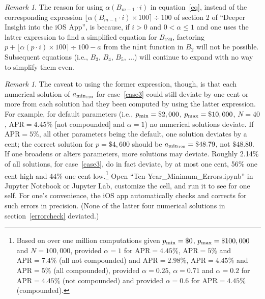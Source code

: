 \documentclass[12pt,letterpaper,oneside]{article}
\theoremstyle{remark} %
\newtheorem{remark}[theorem]{Remark}
\begin{document}
	\newpage
	\begin{remark}
	The reason for using $\alpha\left(B_{m-1}\cdot i\right)$ in equation~\ref{eq}, instead of the corresponding expression $\big\lfloor{\alpha\left(B_{m-1}\cdot i\right)\times 100}\big\rceil\div 100$ of section 2 of ``Deeper Insight into the iOS App'', is because, if $i>0$ and $0<\alpha\leq1$ and one uses the latter expression to find a simplified equation for $B_{120}$, factoring $p+\big\lfloor{\alpha\left(p\cdot i\right)\times 100}\big\rceil\div 100-a$ from the \texttt{nint} function in $B_{2}$ will not be possible. Subsequent equations (i.e., $B_{3}$, $B_{4}$, $B_{5}$, $\dots$) will continue to expand with no way to simplify them even.
	\end{remark}
	
	\vspace{12pt}
	\begin{remark} The caveat to using the former expression, though, is that each numerical solution of $a_{\rm{min_{120}}}$ for case~\ref{case3} could still deviate by one cent or more from each solution had they been computed by using the latter expression. For example, for default parameters (i.e., $p_{\rm{min}}=\$2,000$, $p_{\rm{max}}=\$10,000$, $N=40$, $\mbox{APR}=4.45\%$ [not compounded] and $\alpha =1$) no numerical solutions deviate. If $\mbox{APR}=5\%$, all other parameters being the default, one solution deviates by a cent; the correct solution for $p=\$4,600$ should be $a_{\rm{min_{120}}}=\$48.79$, not $\$48.80$. If one broadens or alters parameters, more solutions may deviate. Roughly 2.14\% of all solutions, for case~\ref{case3}, do in fact deviate, by at most one cent, 56\% one cent high and 44\% one cent low.\footnote{Based on over one million computations given $p_{\rm{min}}=\$0$, $p_{\rm{max}}=\$100,000$ and $N=100,000$, provided $\alpha =1$ for $\mbox{APR}=4.45\%$, $\mbox{APR}=5\%$ and $\mbox{APR}=7.4\%$ (all not compounded) and $\mbox{APR}=2.98\%$, $\mbox{APR}=4.45\%$ and $\mbox{APR}=5\%$ (all compounded), provided $\alpha =0.25$, $\alpha =0.71$ and $\alpha =0.2$ for $\mbox{APR}=4.45\%$ (not compounded) and provided $\alpha =0.6$ for $\mbox{APR}=4.45\%$ (compounded).} Open ``Ten-Year\_Minimum\_Errors.ipynb'' in Jupyter Notebook or Jupyter Lab, customize the cell, and run it to see for one self. For one's convenience, the iOS app automatically checks and corrects for such errors in precision. (None of the latter four numerical solutions in section~\ref{errorcheck} deviated.)
	\end{remark}	
\end{document}
